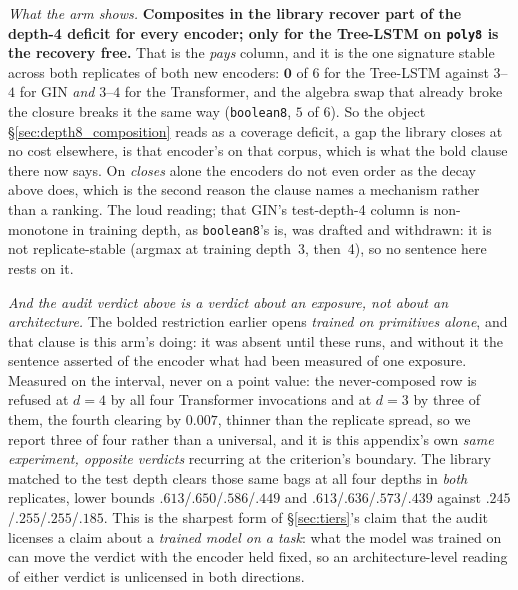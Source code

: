 \emph{What the arm shows.} \textbf{Composites in the library recover part of the depth-4 deficit for every
encoder; only for the Tree-LSTM on \texttt{poly8} is the recovery free.} That is the \emph{pays} column, and it
is the one signature stable across both replicates of both new encoders: $\mathbf{0}$ of $6$ for the Tree-LSTM
against $3$--$4$ for GIN \emph{and} $3$--$4$ for the Transformer, and the algebra swap that already broke the closure breaks it the same way
(\texttt{boolean8}, $5$ of $6$). So the object \S\ref{sec:depth8_composition} reads as a coverage deficit, a
gap the library closes at no cost elsewhere, is that encoder's on that corpus, which is what the bold clause
there now says. On \emph{closes} alone the encoders do not even order as the decay above does, which is the
second reason the clause names a mechanism rather than a ranking. The loud reading; that GIN's test-depth-4
column is non-monotone in training depth, as \texttt{boolean8}'s is, was drafted and withdrawn: it is not
replicate-stable (argmax at training depth~3, then~4), so no sentence here rests on it.

\emph{And the audit verdict above is a verdict about an exposure, not about an architecture.} The bolded
restriction earlier opens \emph{trained on primitives alone}, and that clause is this arm's doing: it was absent
until these runs, and without it the sentence asserted of the encoder what had been measured of one exposure.
Measured on the interval, never on a point value: the never-composed row is refused at $d{=}4$ by all four
Transformer invocations and at $d{=}3$ by three of them, the fourth clearing by $0.007$, thinner than the
replicate spread, so we report three of four rather than a universal, and it is this appendix's own \emph{same
experiment, opposite verdicts} recurring at the criterion's boundary. The library matched to the test depth clears
those same bags at all four depths in \emph{both} replicates, lower bounds $.613$/$.650$/$.586$/$.449$ and
$.613$/$.636$/$.573$/$.439$ against $.245$/$.255$/$.255$/$.185$. This is the sharpest form of \S\ref{sec:tiers}'s claim that the audit licenses
a claim about a \emph{trained model on a task}: what the model was trained on can move the verdict with the
encoder held fixed, so an architecture-level reading of either verdict is unlicensed in both directions.

